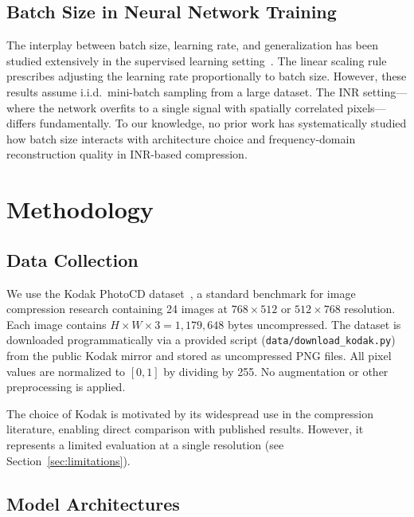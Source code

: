 \documentclass[a4paper,oneside,11pt,english]{scrartcl}
\begin{document}
\subsection{Batch Size in Neural Network Training}

The interplay between batch size, learning rate, and generalization has been
studied extensively in the supervised learning
setting~\cite{keskar2017largebatch, smith2018dont}.  The linear scaling
rule~\cite{goyal2017accurate} prescribes adjusting the learning rate
proportionally to batch size.  However, these results assume i.i.d.\
mini-batch sampling from a large dataset.  The INR setting---where the
network overfits to a single signal with spatially correlated pixels---differs
fundamentally.  To our knowledge, no prior work has systematically studied how
batch size interacts with architecture choice and frequency-domain
reconstruction quality in INR-based compression.


\section{Methodology}
\label{sec:methodology}

\subsection{Data Collection}

We use the Kodak PhotoCD dataset~\cite{kodak}, a standard benchmark for image compression
research containing 24 images at $768 \times 512$ or $512 \times 768$
resolution.  Each image contains $H \times W \times 3 = 1{,}179{,}648$ bytes
uncompressed.  The dataset is downloaded programmatically via a provided
script (\texttt{data/download\_kodak.py}) from the public Kodak mirror and
stored as uncompressed PNG files.  All pixel values are normalized to $[0,1]$
by dividing by 255.  No augmentation or other preprocessing is applied.

The choice of Kodak is motivated by its widespread use in the compression
literature, enabling direct comparison with published results.  However, it
represents a limited evaluation at a single resolution (see
Section~\ref{sec:limitations}).

\subsection{Model Architectures}
\label{sec:architectures}
\end{document}
